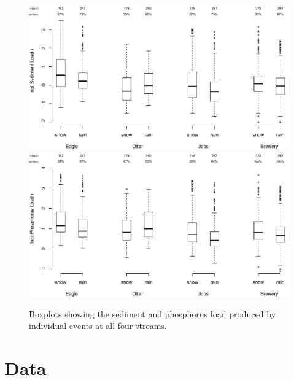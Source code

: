 \documentclass[12pt]{article}
\begin{document}
\begin{figure}[h]
    \begin{center}
\includegraphics{loadings-boxplot_stot}\\
    \vspace{15mm}
\includegraphics{loadings-boxplot_ptot}
    \caption{Boxplots showing the sediment and phosphorus load produced by individual events at all four streams.\label{boxplots}}
    \end{center}
\end{figure}


















\section{Data}
\end{document}
